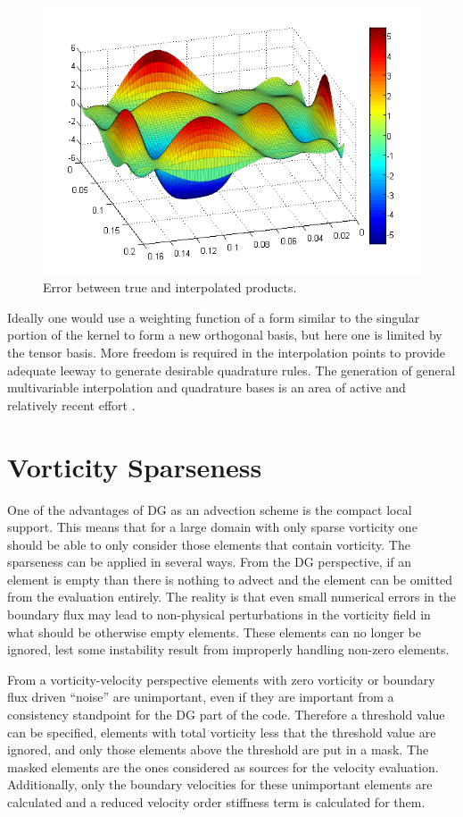 \documentclass[letterpaper,12pt]{report}
\begin{document}
\begin{figure}
\centering
\includegraphics[width=5.5in]{wKerror.PNG}
\caption{\label{fig:wKerror}Error between true and interpolated products.}
\end{figure}

Ideally one would use a weighting function of a form similar to the singular portion of the kernel to form a new orthogonal basis, but here one is limited by the tensor basis. More freedom is required in the interpolation points to provide adequate leeway to generate desirable quadrature rules. The generation of general multivariable interpolation and quadrature bases is an area of active and relatively recent effort \cite{Gasca2000,Xu2012,Gautschi2013}.

%
\section{Vorticity Sparseness}
One of the advantages of DG as an advection scheme is the compact local support. This means that for a large domain with only sparse vorticity one should be able to only consider those elements that contain vorticity. The sparseness can be applied in several ways. From the DG perspective, if an element is empty than there is nothing to advect and the element can be omitted from the evaluation entirely. The reality is that even small numerical errors in the boundary flux may lead to non-physical perturbations in the vorticity field in what should be otherwise empty elements. These elements can no longer be ignored, lest some instability result from improperly handling non-zero elements.

From a vorticity-velocity perspective elements with zero vorticity or boundary flux driven ``noise'' are unimportant, even if they are important from a consistency standpoint for the DG part of the code. Therefore a threshold value can be specified, elements with total vorticity less that the threshold value are ignored, and only those elements above the threshold are put in a mask. The masked elements are the ones considered as sources for the velocity evaluation. Additionally, only the boundary velocities for these unimportant elements are calculated and a reduced velocity order stiffness term is calculated for them.
\end{document}
